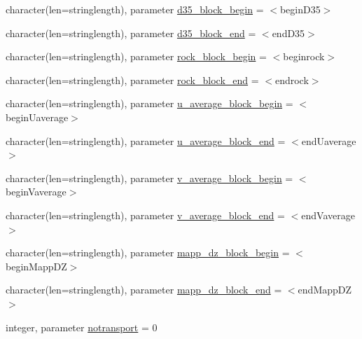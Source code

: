 \begin{DoxyCompactItemize}
\item 
character(len=stringlength), parameter \mbox{\hyperlink{namespacemodulesand_ab0757e9853006bd56c73d1d2e9364af0}{d35\+\_\+block\+\_\+begin}} = \textquotesingle{}$<$begin\+D35$>$\textquotesingle{}
\item 
character(len=stringlength), parameter \mbox{\hyperlink{namespacemodulesand_a0ac002d2a3d1be2ec51cfd17da32e116}{d35\+\_\+block\+\_\+end}} = \textquotesingle{}$<$end\+D35$>$\textquotesingle{}
\item 
character(len=stringlength), parameter \mbox{\hyperlink{namespacemodulesand_a7da6be1e098a2edd5c92923bfbf75746}{rock\+\_\+block\+\_\+begin}} = \textquotesingle{}$<$beginrock$>$\textquotesingle{}
\item 
character(len=stringlength), parameter \mbox{\hyperlink{namespacemodulesand_a33095858e39945eed4d56fc67dc8a546}{rock\+\_\+block\+\_\+end}} = \textquotesingle{}$<$endrock$>$\textquotesingle{}
\item 
character(len=stringlength), parameter \mbox{\hyperlink{namespacemodulesand_ae1bb22f3a20787f4780916afec5b06a4}{u\+\_\+average\+\_\+block\+\_\+begin}} = \textquotesingle{}$<$begin\+Uaverage$>$\textquotesingle{}
\item 
character(len=stringlength), parameter \mbox{\hyperlink{namespacemodulesand_a119ec2cbb9dd408931f9313462a82e16}{u\+\_\+average\+\_\+block\+\_\+end}} = \textquotesingle{}$<$end\+Uaverage$>$\textquotesingle{}
\item 
character(len=stringlength), parameter \mbox{\hyperlink{namespacemodulesand_ac7fa16fb5226094713f82fcffe0220e5}{v\+\_\+average\+\_\+block\+\_\+begin}} = \textquotesingle{}$<$begin\+Vaverage$>$\textquotesingle{}
\item 
character(len=stringlength), parameter \mbox{\hyperlink{namespacemodulesand_a1d8c89cafe87ef657aedd36384f37d22}{v\+\_\+average\+\_\+block\+\_\+end}} = \textquotesingle{}$<$end\+Vaverage$>$\textquotesingle{}
\item 
character(len=stringlength), parameter \mbox{\hyperlink{namespacemodulesand_a3929a480a9b443724c6ffdd34b729dec}{mapp\+\_\+dz\+\_\+block\+\_\+begin}} = \textquotesingle{}$<$begin\+Mapp\+DZ$>$\textquotesingle{}
\item 
character(len=stringlength), parameter \mbox{\hyperlink{namespacemodulesand_aa6b7846e5c1d3f70a1f74b7ff2251da6}{mapp\+\_\+dz\+\_\+block\+\_\+end}} = \textquotesingle{}$<$end\+Mapp\+DZ$>$\textquotesingle{}
\item 
integer, parameter \mbox{\hyperlink{namespacemodulesand_aa59ec934232f5ae7c275d0b8e91f4b40}{notransport}} = 0

\end{DoxyCompactItemize}
